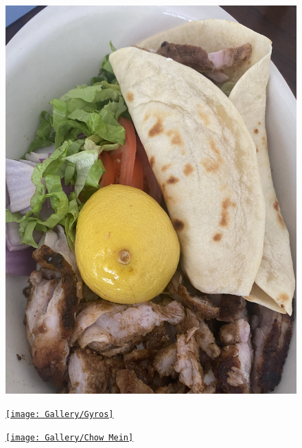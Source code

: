 \documentclass[]{article}
\begin{document}
\newpage\begin{figure}[H]
\begin{center}\hyperref[rec:Chicken Shawarma]{\includegraphics[keepaspectratio,width=\textheight,height=\textwidth,angle=-90]{Gallery/Chicken Shawarma}}\caption*{}\label{fig:Chicken Shawarma}\end{center}
\end{figure}
\newpage\begin{figure}[H]
\begin{center}\hyperref[rec:Gyros]{\texttt{[image: Gallery/Gyros]}}\caption*{}\label{fig:Gyros}\end{center}
\end{figure}
\newpage\begin{figure}[H]
\begin{center}\hyperref[rec:Chow Mein]{\texttt{[image: Gallery/Chow Mein]}}\caption*{}\label{fig:Chow Mein}\end{center}
\end{figure}
\end{document}
